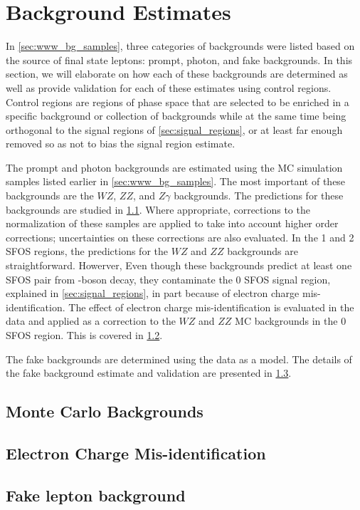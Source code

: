 \section{Background Estimates}
\label{sec:bg_estimates}

In \sec\ref{sec:www_bg_samples}, three categories of backgrounds
were listed based on the source
of final state leptons: prompt, photon, and fake
backgrounds. In this section, we will elaborate on how
each of these backgrounds are determined as well
as provide validation for each of these estimates using
control regions. Control regions are regions of phase space
that are selected to be enriched in a specific background
or collection of backgrounds while at the same time being
orthogonal to the signal regions of \sec\ref{sec:signal_regions},
or at least far enough removed so as not to bias the signal region
estimate.

The prompt and photon backgrounds are estimated using 
the MC simulation samples listed earlier in \sec\ref{sec:www_bg_samples}.
The most important of these backgrounds are the $WZ$, $ZZ$, 
and $Z\gamma$ backgrounds. The predictions for these backgrounds
are studied in \sec\ref{sec:mcbg}. Where appropriate, corrections
to the normalization
of these samples are applied to take into account higher order 
corrections; uncertainties on these corrections are also evaluated.
In the 1 and 2 SFOS regions, the predictions for the $WZ$ and $ZZ$
backgrounds are straightforward. 
Howerver, Even though these backgrounds predict
at least one SFOS pair from \z-boson decay,
they contaminate the 0 SFOS signal region,
explained in \sec\ref{sec:signal_regions}, in part because
of electron charge mis-identification.  The effect of 
electron charge mis-identification is evaluated in the data
and applied as a correction to the $WZ$ and $ZZ$ MC backgrounds
in the 0 SFOS region. This is covered in \sec\ref{sec:charge_misid}.

The fake backgrounds are determined 
using the data as a model. The details of the fake background
estimate and validation are presented in \sec\ref{sec:bg_fake}.





\subsection{Monte Carlo Backgrounds}
\label{sec:mcbg}

\subsection{Electron Charge Mis-identification}
\label{sec:charge_misid}
  
\subsection{Fake lepton background}
\label{sec:bg_fake}

